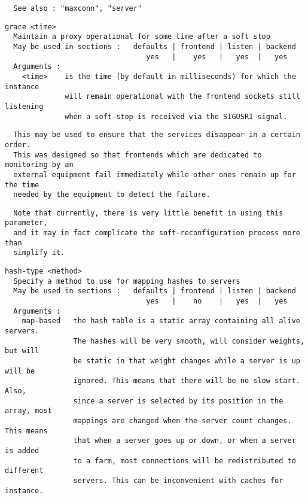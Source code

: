 \begin{verbatim}
  See also : "maxconn", "server"
\end{verbatim}

\begin{verbatim}
grace <time>
  Maintain a proxy operational for some time after a soft stop
  May be used in sections :   defaults | frontend | listen | backend
                                 yes   |    yes   |   yes  |   yes
  Arguments :
    <time>    is the time (by default in milliseconds) for which the instance
              will remain operational with the frontend sockets still listening
              when a soft-stop is received via the SIGUSR1 signal.
\end{verbatim}

\begin{verbatim}
  This may be used to ensure that the services disappear in a certain order.
  This was designed so that frontends which are dedicated to monitoring by an
  external equipment fail immediately while other ones remain up for the time
  needed by the equipment to detect the failure.
\end{verbatim}

\begin{verbatim}
  Note that currently, there is very little benefit in using this parameter,
  and it may in fact complicate the soft-reconfiguration process more than
  simplify it.
\end{verbatim}

\begin{verbatim}
hash-type <method>
  Specify a method to use for mapping hashes to servers
  May be used in sections :   defaults | frontend | listen | backend
                                 yes   |    no    |   yes  |   yes
  Arguments :
    map-based   the hash table is a static array containing all alive servers.
                The hashes will be very smooth, will consider weights, but will
                be static in that weight changes while a server is up will be
                ignored. This means that there will be no slow start. Also,
                since a server is selected by its position in the array, most
                mappings are changed when the server count changes. This means
                that when a server goes up or down, or when a server is added
                to a farm, most connections will be redistributed to different
                servers. This can be inconvenient with caches for instance.
\end{verbatim}

